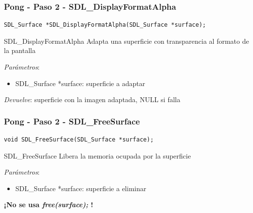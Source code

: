 \begin{frame}[fragile]
    \frametitle{Pong - Paso 2 - SDL\_DisplayFormatAlpha}
	
\begin{verbatim}
SDL_Surface *SDL_DisplayFormatAlpha(SDL_Surface *surface);
\end{verbatim}

    \begin{block}{SDL\_DisplayFormatAlpha}
	Adapta una superficie con transparencia al formato de la pantalla
	
	\emph{Parámetros}:
	\begin{itemize}
	    \item SDL\_Surface *surface: superficie a adaptar
	\end{itemize}
	
	\emph{Devuelve}: superficie con la imagen adaptada, NULL si falla
    \end{block}

\end{frame}

\begin{frame}[fragile]
    \frametitle{Pong - Paso 2 - SDL\_FreeSurface}
	
\begin{verbatim}
void SDL_FreeSurface(SDL_Surface *surface);
\end{verbatim}

    \begin{block}{SDL\_FreeSurface}
	Libera la memoria ocupada por la superficie
	
	\emph{Parámetros}:
	\begin{itemize}
	    \item SDL\_Surface *surface: superficie a eliminar
	\end{itemize}
    \end{block}
    
    \begin{center}
    \textbf{¡No se usa \emph{free(surface);} !}
    \end{center}

\end{frame}

